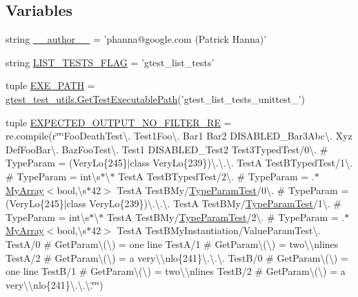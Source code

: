\subsection*{Variables}
\begin{DoxyCompactItemize}
\item 
string \hyperlink{namespacegtest__list__tests__unittest_a713be99fff40e5e280886232fa2f35ff}{\-\_\-\-\_\-author\-\_\-\-\_\-} = 'phanna@google.\-com (Patrick Hanna)'
\item 
string \hyperlink{namespacegtest__list__tests__unittest_a658d9ea18c57a13a25d0cce73d314e7a}{L\-I\-S\-T\-\_\-\-T\-E\-S\-T\-S\-\_\-\-F\-L\-A\-G} = 'gtest\-\_\-list\-\_\-tests'
\item 
tuple \hyperlink{namespacegtest__list__tests__unittest_afb67ca7674b402c226255d27f9147409}{E\-X\-E\-\_\-\-P\-A\-T\-H} = \hyperlink{namespacegtest__test__utils_a1bdf3cac86afa675ed37629b183048e9}{gtest\-\_\-test\-\_\-utils.\-Get\-Test\-Executable\-Path}('gtest\-\_\-list\-\_\-tests\-\_\-unittest\-\_\-')
\item 
tuple \hyperlink{namespacegtest__list__tests__unittest_a57e38bc2bb7e78ba6b2ae48a1569d1f3}{E\-X\-P\-E\-C\-T\-E\-D\-\_\-\-O\-U\-T\-P\-U\-T\-\_\-\-N\-O\-\_\-\-F\-I\-L\-T\-E\-R\-\_\-\-R\-E} = re.\-compile(r\char`\"{}\char`\"{}\char`\"{}Foo\-Death\-Test\textbackslash{}. Test1\-Foo\textbackslash{}. Bar1 Bar2 D\-I\-S\-A\-B\-L\-E\-D\-\_\-\-Bar3\-Abc\textbackslash{}. Xyz Def\-Foo\-Bar\textbackslash{}. Baz\-Foo\-Test\textbackslash{}. Test1 D\-I\-S\-A\-B\-L\-E\-D\-\_\-\-Test2 Test3\-Typed\-Test/0\textbackslash{}. \# Type\-Param = (Very\-Lo\{245\}$\vert$class Very\-Lo\{239\})\textbackslash{}.\textbackslash{}.\textbackslash{}. Test\-A Test\-B\-Typed\-Test/1\textbackslash{}. \# Type\-Param = int\textbackslash{}s$\ast$\textbackslash{}$\ast$ Test\-A Test\-B\-Typed\-Test/2\textbackslash{}. \# Type\-Param = .$\ast$\hyperlink{class_my_array}{My\-Array}$<$bool,\textbackslash{}s$\ast$42$>$ Test\-A Test\-B\-My/\hyperlink{class_type_param_test}{Type\-Param\-Test}/0\textbackslash{}. \# Type\-Param = (Very\-Lo\{245\}$\vert$class Very\-Lo\{239\})\textbackslash{}.\textbackslash{}.\textbackslash{}. Test\-A Test\-B\-My/\hyperlink{class_type_param_test}{Type\-Param\-Test}/1\textbackslash{}. \# Type\-Param = int\textbackslash{}s$\ast$\textbackslash{}$\ast$ Test\-A Test\-B\-My/\hyperlink{class_type_param_test}{Type\-Param\-Test}/2\textbackslash{}. \# Type\-Param = .$\ast$\hyperlink{class_my_array}{My\-Array}$<$bool,\textbackslash{}s$\ast$42$>$ Test\-A Test\-B\-My\-Instantiation/Value\-Param\-Test\textbackslash{}. Test\-A/0 \# Get\-Param\textbackslash{}(\textbackslash{}) = one line Test\-A/1 \# Get\-Param\textbackslash{}(\textbackslash{}) = two\textbackslash{}\textbackslash{}nlines Test\-A/2 \# Get\-Param\textbackslash{}(\textbackslash{}) = a very\textbackslash{}\textbackslash{}nlo\{241\}\textbackslash{}.\textbackslash{}.\textbackslash{}. Test\-B/0 \# Get\-Param\textbackslash{}(\textbackslash{}) = one line Test\-B/1 \# Get\-Param\textbackslash{}(\textbackslash{}) = two\textbackslash{}\textbackslash{}nlines Test\-B/2 \# Get\-Param\textbackslash{}(\textbackslash{}) = a very\textbackslash{}\textbackslash{}nlo\{241\}\textbackslash{}.\textbackslash{}.\textbackslash{}.\char`\"{}\char`\"{}\char`\"{})

\end{DoxyCompactItemize}
